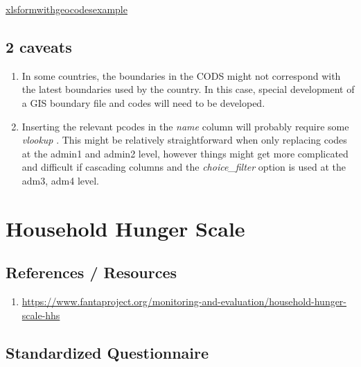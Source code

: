\documentclass[
]{book}
\providecommand{\tightlist}{%
  \setlength{\itemsep}{0pt}\setlength{\parskip}{0pt}}
\begin{document}
\href{https://github.com/WFP-VAM/RBD_FS_CH_guide_EN/blob/master/questionnaires/xlsformwithgeocodesexample.xlsx}{xlsformwithgeocodesexample}

\hypertarget{caveats}{%
\section{2 caveats}\label{caveats}}

\begin{enumerate}
\def\labelenumi{\arabic{enumi}.}
\item
  In some countries, the boundaries in the CODS might not correspond with the latest boundaries used by the country. In this case, special development of a GIS boundary file and codes will need to be developed.
\item
  Inserting the relevant pcodes in the \emph{name} column will probably require some \emph{vlookup} . This might be relatively straightforward when only replacing codes at the admin1 and admin2 level, however things might get more complicated and difficult if cascading columns and the \emph{choice\_filter} option is used at the adm3, adm4 level.
\end{enumerate}

\hypertarget{household-hunger-scale}{%
\chapter{Household Hunger Scale}\label{household-hunger-scale}}

\hypertarget{references-resources}{%
\section{References / Resources}\label{references-resources}}

\begin{enumerate}
\def\labelenumi{\arabic{enumi}.}
\tightlist
\item
  \url{https://www.fantaproject.org/monitoring-and-evaluation/household-hunger-scale-hhs}
\end{enumerate}

\hypertarget{standardized-questionnaire}{%
\section{Standardized Questionnaire}\label{standardized-questionnaire}}
\end{document}
